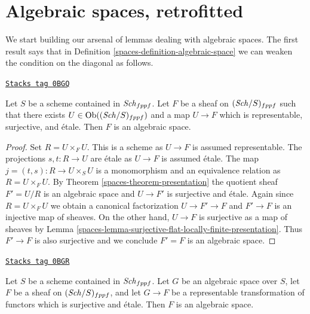 \section{Algebraic spaces, retrofitted}
\label{spaces-section-algebraic-spaces-retrofitted}
We start building our arsenal of lemmas dealing with algebraic spaces.
The first result says that in Definition \ref{spaces-definition-algebraic-space}
we can weaken the condition on the diagonal as follows.

\begin{lemma}
\label{spaces-lemma-etale-locally-representable-gives-space}
\href{https://stacks.math.columbia.edu/tag/0BGQ}{\texttt{Stacks tag 0BGQ}}

Let $S$ be a scheme contained in $\mathit{Sch}_{fppf}$.
Let $F$ be a sheaf on $(\mathit{Sch}/S)_{fppf}$
such that there exists $U \in \operatorname{Ob}((\mathit{Sch}/S)_{fppf})$ and a map
$U \to F$ which is representable, surjective, and \'etale.
Then $F$ is an algebraic space.
\end{lemma}

\begin{proof}

Set $R = U \times_F U$. This is a scheme as $U \to F$ is assumed representable.
The projections $s, t : R \to U$ are \'etale as $U \to F$ is assumed \'etale.
The map $j = (t, s) : R \to U \times_S U$ is a monomorphism and an equivalence
relation as $R = U \times_F U$. By Theorem \ref{spaces-theorem-presentation}
the quotient sheaf $F' = U/R$ is an algebraic space and $U \to F'$
is surjective and \'etale. Again since $R = U \times_F U$ we obtain
a canonical factorization $U \to F' \to F$ and $F' \to F$ is an injective
map of sheaves. On the other hand, $U \to F$ is surjective as a map
of sheaves by Lemma \ref{spaces-lemma-surjective-flat-locally-finite-presentation}.
Thus $F' \to F$ is also surjective and we conclude $F' = F$ is an
algebraic space.
\end{proof}

\begin{lemma}
\label{spaces-lemma-etale-locally-representable-by-space-gives-space}
\href{https://stacks.math.columbia.edu/tag/0BGR}{\texttt{Stacks tag 0BGR}}

Let $S$ be a scheme contained in $\mathit{Sch}_{fppf}$. Let $G$ be an algebraic
space over $S$, let $F$ be a sheaf on $(\mathit{Sch}/S)_{fppf}$, and let
$G \to F$ be a representable transformation of functors which is
surjective and \'etale. Then $F$ is an algebraic space.
\end{lemma}


